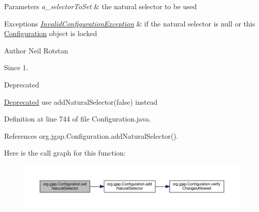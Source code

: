 \begin{DoxyParams}{Parameters}
{\em a\-\_\-selector\-To\-Set} & the natural selector to be used\\
\hline
\end{DoxyParams}

\begin{DoxyExceptions}{Exceptions}
{\em \hyperlink{classorg_1_1jgap_1_1_invalid_configuration_exception}{Invalid\-Configuration\-Exception}} & if the natural selector is null or this \hyperlink{classorg_1_1jgap_1_1_configuration}{Configuration} object is locked\\
\hline
\end{DoxyExceptions}
\begin{DoxyAuthor}{Author}
Neil Rotstan 
\end{DoxyAuthor}
\begin{DoxySince}{Since}
1. 
\end{DoxySince}
\begin{DoxyRefDesc}{Deprecated}
\item[\hyperlink{deprecated__deprecated000001}{Deprecated}]use add\-Natural\-Selector(false) instead \end{DoxyRefDesc}


Definition at line 744 of file Configuration.\-java.



References org.\-jgap.\-Configuration.\-add\-Natural\-Selector().



Here is the call graph for this function\-:
\nopagebreak
\begin{figure}[H]
\begin{center}
\leavevmode
\includegraphics[width=350pt]{classorg_1_1jgap_1_1_configuration_ac0c94af73f8ac7e40c3e316621c9a377_cgraph}
\end{center}
\end{figure}


